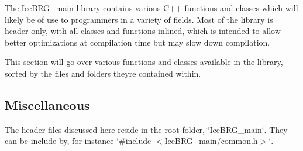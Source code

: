 The Ice\+B\+R\+G\+\_\+main library contains various C++ functions and classes which will likely be of use to programmers in a variety of fields. Most of the library is header-\/only, with all classes and functions inlined, which is intended to allow better optimizations at compilation time but may slow down compilation.

This section will go over various functions and classes available in the library, sorted by the files and folders they\textquotesingle{}re contained within.

\subsection*{Miscellaneous}

The header files discussed here reside in the root folder, \char`\"{}\+Ice\+B\+R\+G\+\_\+main\char`\"{}. They can be include by, for instance \char`\"{}\#include
$<$\+Ice\+B\+R\+G\+\_\+main/common.\+h$>$\char`\"{}.


